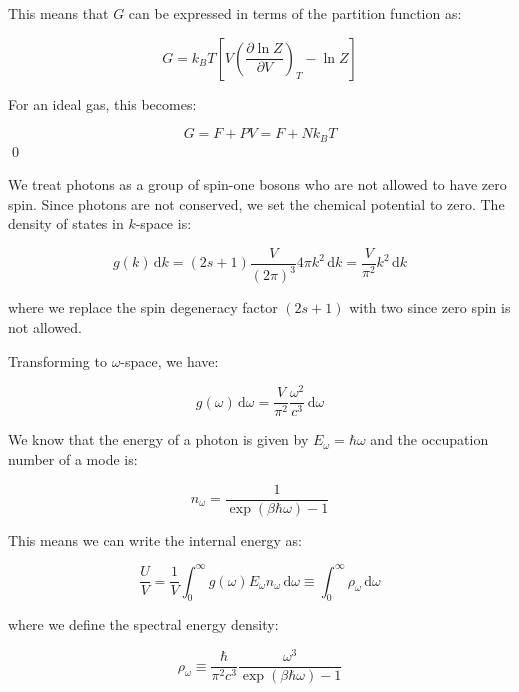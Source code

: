 \documentclass[12pt]{article}
\begin{document}
This means that $G$ can be expressed in terms of the partition function as:

\begin{equation}
    G = k_{B}T \left[ V \left( \frac{\partial \ln{Z}}{\partial V} \right)_{T} - \ln{Z} \right]
\end{equation}

For an ideal gas, this becomes:

\begin{equation}
    G = F + PV = F + Nk_{B}T
\end{equation}
\qed


We treat photons as a group of spin-one bosons who are not allowed to have zero spin. Since photons are not conserved, we set the chemical potential to zero. The density of states in $k$-space is:

\begin{equation}
    g(k) \, \mathrm{d}k = (2s + 1) \frac{V}{(2\pi)^{3}} 4\pi k^{2} \, \mathrm{d}k = \frac{V}{\pi^{2}} k^{2} \, \mathrm{d}k
\end{equation}

where we replace the spin degeneracy factor $(2s + 1)$ with two since zero spin is not allowed.

Transforming to $\omega$-space, we have:

\begin{equation}
    g(\omega) \, \mathrm{d}\omega = \frac{V}{\pi^{2}} \frac{\omega^{2}}{c^{3}} \, \mathrm{d}\omega
\end{equation}

We know that the energy of a photon is given by $E_{\omega} = \hbar \omega$ and the occupation number of a mode is:

\begin{equation}
    n_{\omega} = \frac{1}{\exp\left( \beta \hbar \omega \right) - 1}
\end{equation}

This means we can write the internal energy as:

\begin{equation}
    \frac{U}{V} = \frac{1}{V} \int_{0}^{\infty} g(\omega) E_{\omega} n_{\omega} \, \mathrm{d}\omega \equiv \int_{0}^{\infty} \rho_{\omega} \, \mathrm{d}\omega
\end{equation}

where we define the spectral energy density:

\begin{equation}
    \rho_{\omega} \equiv \frac{\hbar}{\pi^{2}c^{3}} \frac{\omega^{3}}{\exp\left( \beta \hbar \omega \right) - 1}
\end{equation}
\end{document}
